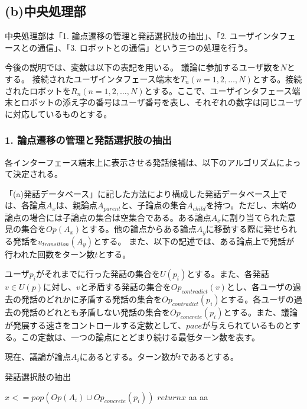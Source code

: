 \documentclass[11pt, a4paper]{jreport} %
\begin{document}
\subsection*{(b)中央処理部}
中央処理部は「1. 論点遷移の管理と発話選択肢の抽出」、「2. ユーザインタフェースとの通信」、「3. ロボットとの通信」という三つの処理を行う。



今後の説明では、変数は以下の表記を用いる。
議論に参加するユーザ数を$N$とする。
接続されたユーザインタフェース端末を$T_n (n = 1, 2, \dots, N)$とする。接続されたロボットを$R_n (n = 1, 2, \dots, N)$とする。ここで、ユーザインタフェース端末とロボットの添え字の番号はユーザ番号を表し、それぞれの数字は同じユーザに対応しているものとする。


\subsubsection{1. 論点遷移の管理と発話選択肢の抽出}
各インターフェース端末上に表示させる発話候補は、以下のアルゴリズムによって決定される。


「(a)発話データベース」に記した方法により構成した発話データベース上では、各論点$A_x$は、親論点$A_{parent}$と、子論点の集合$A_{child}$を持つ。ただし、末端の論点の場合には子論点の集合は空集合である。ある論点$A_x$に割り当てられた意見の集合を$Op(A_x)$とする。他の論点からある論点$A_y$に移動する際に発せられる発話を$u_{transition}(A_y)$とする。
また、以下の記述では、ある論点上で発話が行われた回数をターン数$t$とする。


ユーザ$p_i$がそれまでに行った発話の集合を$U(p_i)$とする。また、各発話$v \in U(p)$に対し、$v$と矛盾する発話の集合を$Op_{contradict}(v)$とし、各ユーザの過去の発話のどれかに矛盾する発話の集合を$Op_{contradict}(p_i)$とする。各ユーザの過去の発話のどれとも矛盾しない発話の集合を$Op_{concrete}(p_i)$とする。また、議論が発展する速さをコントロールする定数として、$pace$が与えられているものとする。この定数は、一つの論点にとどまり続ける最低ターン数を表す。


現在、議論が論点$A_i$にあるとする。ターン数が$t$であるとする。
\begin{algorithm}
\caption{発話選択肢の抽出}
\begin{algorithmic}[1]
 \STATE $x <= pop(Op(A_i) \cup Op_{concrete}(p_i))$
 \STATE $return x$
 \STATE aa
 \ENDIF
\ELSE
 \STATE aa
\ENDIF

\end{algorithmic} 
\end{algorithm}
\end{document}

